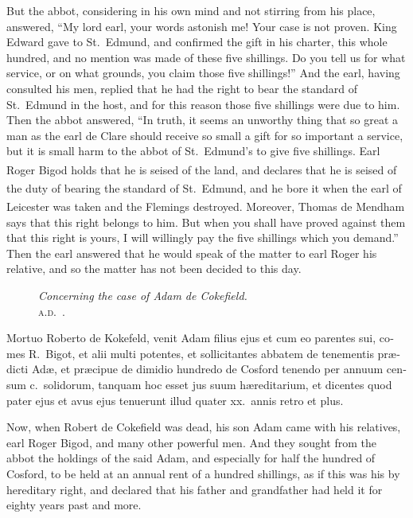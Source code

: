 \documentclass[10pt]{book}
\newcounter{engnote}
\newcommand{\engnotenum}{\textsuperscript{\arabic{engnote}\stepcounter{engnote}}}
\newcommand{\blockhead}[4][]{
\begin{figure}
\centering
\vspace{#4}
\parbox{2.75cm}{\begin{center}\footnotesize \color{BrickRed} \emph{#2}\\ #1 \end{center}}
\end{figure}
}
\begin{document}
\begin{paracol}{2}
But the abbot, considering in his own mind and not stirring from his place, answered, ``My lord earl, your words astonish me! Your case is not proven. King Edward gave to St.\ Edmund, and confirmed the gift in his charter, this whole hundred, and no mention was made of these five shillings. Do you tell us for what service, or on what grounds, you claim those five shillings!'' And the earl, having consulted his men, replied that he had the right to bear the standard of St.\ Edmund in the host, and for this reason those five shillings were due to him. Then the abbot answered, ``In truth, it seems an unworthy thing that so great a man as the earl de Clare should receive so small a gift for so important a service, but it is small harm to the abbot of St.\ Edmund's to give five shillings. Earl Roger Bigod\engnotenum{} holds that he is seised of the land, and declares that he is seised of the duty of bearing the standard of St.\ Edmund,\engnotenum{} and he bore it when the earl of Leicester was taken and the Flemings destroyed. Moreover, Thomas de Mendham\engnotenum{} says that this right belongs to him. But when you shall have proved against them that this right is yours, I will willingly pay the five shillings which you demand.'' Then the earl answered that he would speak of the matter to earl Roger his relative, and so the matter has not been decided to this day.

\switchcolumn*

\begin{otherlanguage}{latin}
\blockhead[\textsc{a.d}.\ .]{Concerning the case of Adam de Cokefield.}{4}{-.45cm}
Mortuo Roberto de Kokefeld, venit Adam filius ejus et cum eo parentes sui, comes R.\ Bigot, et alii multi potentes, et sollicitantes abbatem de tenementis pr\ae{}dicti Ad\ae{}, et pr\ae{}cipue de dimidio hundredo de Cosford tenendo per annuum censum c.\ solidorum, tanquam hoc esset jus suum h\ae{}reditarium, et dicentes quod pater ejus et avus ejus tenuerunt illud quater xx.\ annis retro et plus.

\end{otherlanguage}

\switchcolumn

Now, when Robert de Cokefield was dead, his son Adam came with his relatives, earl Roger Bigod, and many other powerful men. And they sought from the abbot the holdings of the said Adam, and especially for half the hundred of Cosford, to be held at an annual rent of a hundred shillings, as if this was his by hereditary right, and declared that his father and grandfather had held it for eighty years past and more.


\end{paracol}
\end{document}
